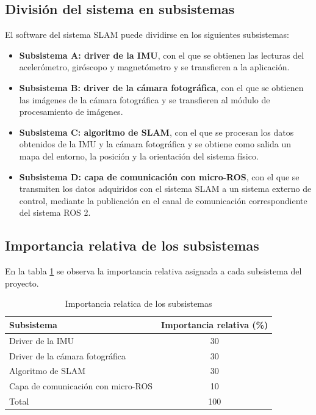 \documentclass[
11pt, %
codirector, %
]{simple_charter}
\begin{document}
\subsection{División del sistema en subsistemas}
\label{ssec:division-del-sistema-en-subsistemas}

El software del sistema SLAM puede dividirse en los siguientes subsistemas:

\begin{itemize}
	\item \textbf{Subsistema A: driver de la IMU}, con el que se obtienen las lecturas del acelerómetro, giróscopo y magnetómetro y se transfieren a la aplicación.
	\item \textbf{Subsistema B: driver de la cámara fotográfica}, con el que se obtienen las imágenes de la cámara fotográfica y se transfieren al módulo de procesamiento de imágenes.
	\item \textbf{Subsistema C: algoritmo de SLAM}, con el que se procesan los datos obtenidos de la
	IMU y la cámara fotográfica y se obtiene como salida un mapa del entorno, la posición y la
	orientación del sistema físico.
	\item \textbf{Subsistema D: capa de comunicación con micro-ROS}, con el que se transmiten los
	datos adquiridos con el sistema SLAM a un sistema externo de control, mediante la publicación
	en el canal de comunicación correspondiente del sistema ROS 2.
\end{itemize}

\subsection{Importancia relativa de los subsistemas}
\label{ssec:importancia-relativa-de-los-subsistemas}

En la tabla \ref{tab:ir-subsys} se observa la importancia relativa asignada a cada subsistema
del proyecto.

\begin{table}[ht]
\centering
\begin{tabular}{@{}lc@{}}
\toprule
Subsistema & Importancia relativa (\%) \\ \midrule
Driver de la IMU & 30 \\
Driver de la cámara fotográfica & 30 \\
Algoritmo de SLAM & 30 \\
Capa de comunicación con micro-ROS & 10 \\
Total & 100 \\ \bottomrule
\end{tabular}
\caption{Importancia relatica de los subsistemas}
\label{tab:ir-subsys}
\end{table}
\end{document}
